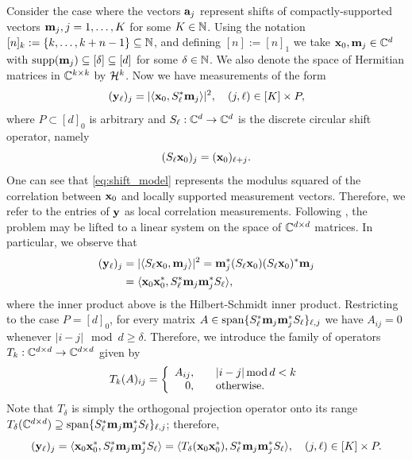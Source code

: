 Consider the case where the vectors $\mathbf a_j$ represent shifts of compactly-supported vectors $\mathbf m_j, j = 1, \ldots, K$ for some $K \in \mathbb{N}$.  Using the notation $[n]_k:=\{k,\ldots,k+n-1\}\subseteq \mathbb{N}$, and defining $[n]:=[n]_1$ we take $\mathbf x_0, \mathbf m_j \in \mathbb{C}^d$ with $\operatorname{supp}(\mathbf m_j)\subseteq[\delta]\subseteq [d]$ for some $\delta \in \mathbb{N}$.  We also denote the space of Hermitian matrices in $\mathbb{C}^{k \times k}$ by $\mathcal{H}^k$.  Now we have measurements of the form \begin{equation} (\mathbf y_\ell)_j = |\langle \mathbf x_0, S^*_\ell \mathbf m_j \rangle|^2, \quad (j, \ell) \in [K] \times P, \label{eq:shift_model} \end{equation} where $P \subset [d]_0$ is arbitrary and $S_\ell : \mathbb{C}^d \to \mathbb{C}^d$ is the discrete circular shift operator, namely \begin{equation*} (S_\ell \mathbf x_0)_j = (\mathbf x_0)_{\ell + j}. \end{equation*}  One can see that \eqref{eq:shift_model} represents the modulus squared of the correlation between $\mathbf x_0$ and locally supported measurement vectors.  Therefore, we refer to the entries of $\mathbf y$ as local correlation measurements.
%
%
Following \cite{balan2006signal,candes2012phaselift,IVW2015_FastPhase}, the problem may be lifted to a linear system on the space of $\mathbb{C}^{d \times d}$ matrices.  In particular, we observe that 
\begin{align*}
	(\mathbf y_\ell)_j &= |\langle S_\ell \mathbf x_0, \mathbf m_j\rangle|^2 = \mathbf m_j^* (S_\ell \mathbf x_0) (S_\ell \mathbf x_0)^* \mathbf m_j \\
	&= \langle \mathbf x_0 \mathbf x_0^*, S_\ell^* \mathbf m_j \mathbf m_j^* S_\ell\rangle,
\end{align*}
where the inner product above is the Hilbert-Schmidt inner product. Restricting to the case $P = [d]_0$,  for every matrix $A \in \mathrm{span}\{S_\ell^* \mathbf m_j \mathbf m_j^* S_\ell\}_{\ell, j}$ we have $A_{ij} = 0$ whenever $|i - j| \mod d \ge \delta$.  Therefore, we introduce the family of operators $T_k : \mathbb{C}^{d \times d} \to \mathbb{C}^{d \times d}$ given by \begin{equation} T_k(A)_{ij} = \left\{\begin{array}{r@{,\qquad}l} A_{ij} & |i - j| \mod d < k \\ 0 & \text{otherwise}. \end{array}\right. \label{eq:T_delta} \end{equation}  Note that $T_\delta$ is simply the orthogonal projection operator onto its range $T_\delta(\mathbb{C}^{d \times d}) \supseteq \mathrm{span}\{S_\ell^* \mathbf m_j \mathbf m_j^* S_\ell\}_{\ell, j}$; therefore, \begin{equation} (\mathbf y_\ell)_j = \langle \mathbf x_0 \mathbf x_0^*, S_\ell^* \mathbf m_j \mathbf m_j^* S_\ell \rangle = \langle T_{\delta}(\mathbf x_0 \mathbf x_0^*), S_\ell^* \mathbf m_j \mathbf m_j^* S_\ell \rangle, \quad (j, \ell) \in [K] \times P. \label{eq:lifted_system} \end{equation}  


